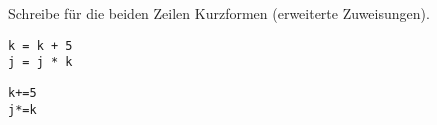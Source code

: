 \question[2]
Schreibe für die beiden Zeilen Kurzformen (erweiterte Zuweisungen).
\begin{lstlisting}
k = k + 5
j = j * k
\end{lstlisting}
\begin{solutionbox}{2cm}
\begin{lstlisting}
k+=5
j*=k
\end{lstlisting}
\end{solutionbox}
